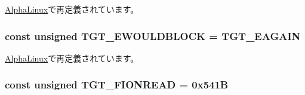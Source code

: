 \hyperlink{classAlphaLinux_aefc7de6c39dd68b971f1fe2c797acd04}{AlphaLinux}で再定義されています。\hypertarget{classLinux_ad8327bcce81f6ea29f92e6422808bbdd}{
\subsubsection[{TGT\_\-EWOULDBLOCK}]{\setlength{\rightskip}{0pt plus 5cm}const unsigned {\bf TGT\_\-EWOULDBLOCK} = {\bf TGT\_\-EAGAIN}}}
\label{classLinux_ad8327bcce81f6ea29f92e6422808bbdd}


\hyperlink{classAlphaLinux_ad8327bcce81f6ea29f92e6422808bbdd}{AlphaLinux}で再定義されています。\hypertarget{classLinux_a1def346ff527c8efccfd52463f3b5dc1}{
\subsubsection[{TGT\_\-FIONREAD}]{\setlength{\rightskip}{0pt plus 5cm}const unsigned {\bf TGT\_\-FIONREAD} = 0x541B}}
\label{classLinux_a1def346ff527c8efccfd52463f3b5dc1}


